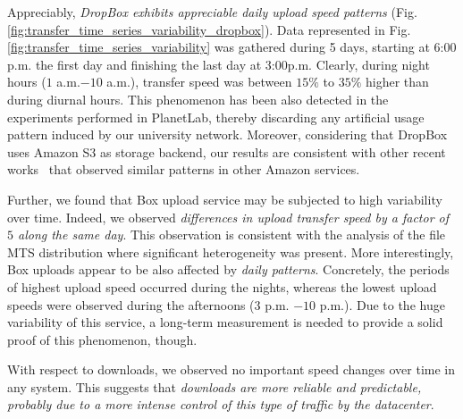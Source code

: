 Appreciably, \textit{DropBox exhibits appreciable 
daily upload speed patterns} (Fig. \ref{fig:transfer_time_series_variability_dropbox}). 
Data represented in Fig. \ref{fig:transfer_time_series_variability} was gathered during 5 days,
starting at $6$:$00$p.m. the first day and finishing the last day at $3$:$00$p.m. Clearly, during 
night hours ($1$ a.m.$-10$ a.m.), transfer speed was between $15\%$ to
$35\%$ higher than during diurnal hours. This phenomenon has been also
detected in the experiments performed in PlanetLab, thereby discarding
any artificial usage pattern induced by our university network. Moreover, considering
that DropBox uses Amazon S3 as storage backend, our results are consistent with
other recent works~\cite{variability_ccgrid11} that observed 
similar patterns in other Amazon services.

Further, we found that Box upload service may be subjected to
high variability over time. Indeed, we observed \textit{differences in
upload transfer speed by a factor of $5$  along the same day}. This observation is consistent 
with the analysis of the file MTS distribution where significant
heterogeneity was present. More interestingly, Box uploads 
appear to be also affected by \textit{daily patterns}. Concretely, 
the periods of highest upload speed occurred during
the nights, whereas the lowest upload speeds were observed during the
afternoons ($3$ p.m. $-10$ p.m.). Due to the huge variability
of this service, a long-term measurement is needed to provide
a solid proof of this phenomenon, though.


With respect to downloads, we observed no important
speed changes over time in any system. This suggests that
\textit{downloads are more reliable and predictable, probably
due to a more intense control of this type of traffic by
the datacenter}.